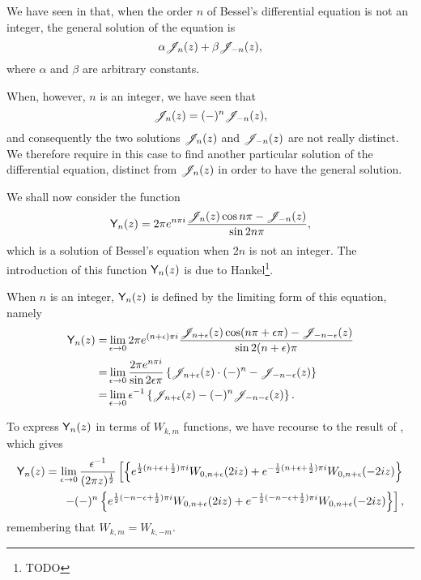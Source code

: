 We have seen in  that, when the order $n$ of
Bessel's differential equation is not an integer, the general
solution of the equation is
$$
\alpha \mathscr{J}_{n}(z) + \beta \mathscr{J}_{-n}(z),
$$
where $\alpha$ and $\beta$ are arbitrary constants.

%
%
When, however, $n$ is an integer, we have seen that
$$
\mathscr{J}_{n}(z) = (-)^{n} \mathscr{J}_{-n}(z),
$$
and consequently the two solutions $\mathscr{J}_{n}(z)$ and $\mathscr{J}_{-n}(z)$ are
not really distinct. We therefore require in this case to find
another particular solution of the differential equation, distinct
from $\mathscr{J}_{n}(z)$ in order to have the general solution.

We shall now consider the function
$$
\mathsf{Y}_{n}(z)
=
2 \pi e^{n \pi i}
\frac{\mathscr{J}_{n}(z)\cos n\pi - \mathscr{J}_{-n}(z)}{\sin 2n\pi},
$$
which is a solution of Bessel's equation when $2n$ is not an
integer.
The introduction of this function $\mathsf{Y}_{n}(z)$ is due to
Hankel\footnote{TODO}.

When $n$ is an integer, $\mathsf{Y}_{n}(z)$ is defined by the limiting
form of this equation, namely
\begin{align*}
  \mathsf{Y}_{n}(z)
  =& \lim_{\epsilon\rightarrow 0}
  2\pi e^{(n+\epsilon)\pi i} \frac{ \mathscr{J}_{n+\epsilon}(z) \cos(n\pi+\epsilon\pi) -
    \mathscr{J}_{-n-\epsilon}(z)}{\sin 2(n+\epsilon)\pi}
  \\
  =& \lim_{\epsilon\rightarrow 0}
  \frac{2\pi e^{n\pi i}}{\sin 2\epsilon\pi}
  \left\{  \mathscr{J}_{n+\epsilon}(z) \cdot(-)^{n} - \mathscr{J}_{-n-\epsilon}(z) \right\}
  \\
  =&
  \lim_{\epsilon\rightarrow 0}
  \epsilon^{-1}
  \left\{  \mathscr{J}_{n+\epsilon}(z) - (-)^{n} \mathscr{J}_{-n-\epsilon}(z) \right\}.
\end{align*}

To express $\mathsf{Y}_{n}(z)$ in terms of $W_{k,m}$ functions, we have
recourse to the result of , which gives
\begin{align*}
  \mathsf{Y}_{n}(z)
  = \lim_{\epsilon\rightarrow 0}
  \frac{\epsilon^{-1}}{ (2\pi z)^{\frac{1}{2}}}
  \left[
    \left\{ 
      e^{\frac{1}{2}(n+\epsilon+\frac{1}{2})\pi i} W_{0,n+\epsilon}(2iz)
      + e^{-\frac{1}{2}(n+\epsilon+\frac{1}{2})\pi i} W_{0,n+\epsilon}(-2iz)
     \right\}
  \right.
  \\
  \left.
    - (-)^{n}
    \left\{ 
      e^{\frac{1}{2}(-n-\epsilon+\frac{1}{2})\pi i} W_{0,n+\epsilon}(2iz)
      + e^{-\frac{1}{2} (-n-\epsilon+\frac{1}{2})\pi i} W_{0,n+\epsilon}(-2iz)
     \right\}
  \right],
\end{align*}
remembering that $W_{k,m} = W_{k,-m}$.

